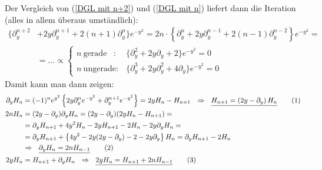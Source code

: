 \documentclass[a4paper,12pt]{article}
\newcommand\numberthis{\addtocounter{equation}{1}\tag{\theequation}}
\newcommand{\kla}{}
\newcommand{\klammer}{}
\begin{document}
Der Vergleich von (\ref{DGL mit n+2}) und (\ref{DGL mit n}) liefert dann die Iteration (alles in allem überaus umständlich):
\begin{align*}
\big\{ \partial_y^{n+2}&+2y\partial_y^{n+1}+2(n+1)\partial_y^n \big\}e^{-y^2}=2n\cdot\klammer\left\{ {\partial_y^{n}+2y\partial_y^{n-1}+2(n-1)\partial_y^{n-2}} \right\}e^{-y^2}=\\
&=\dots \propto\left\{\begin{matrix}
n\ \mathrm{gerade}\ \ \ \,: & \{\partial_y^2+2y\partial_y+2\}e^{-y^2}=0 \\
n\ \mathrm{ungerade}: & \{\partial_y^3+2y\partial_y^2+4\partial_y\}e^{-y^2}=0
\end{matrix}\right.
\end{align*}
Damit kann man dann zeigen:
\begin{align*}
\partial_yH_n&=(-1)^ne^{y^2}\klammer\left\{ {2y\partial_y^ne^{-y^2}+\partial_y^{n+1}e^{-y^2}} \right\}=2yH_n-H_{n+1}\ \ \Rightarrow\ \ \underline{H_{n+1}=\kla\left( {2y-\partial_y} \right)H_n}\numberthis\label{H_n+1=(2y-dy)H_n} \\
2nH_n&=(2y-\partial_y)\partial_yH_n=(2y-\partial_y)(2yH_n-H_{n+1})=\\
&=\partial_yH_{n+1}+4y^2H_n-2yH_{n+1}-2H_n-2y\partial_yH_n=\\
&=\partial_yH_{n+1}+\klammer\left\{ {4y^2-2y(2y-\partial_y)-2-2y\partial_y} \right\}H_n=\partial_yH_{n+1}-2H_n \\
&\Rightarrow\ \ \underline{\partial_yH_n = 2nH_{n-1}}\numberthis\label{dyH_n=2nH_n-1} \\
2yH_n&=H_{n+1}+\partial_yH_n\ \ \Rightarrow\ \ \underline{2yH_n=H_{n+1}+2nH_{n-1}}\numberthis\label{2yH_n=H_n+1+2nH_n-1}
\end{align*}
\end{document}
